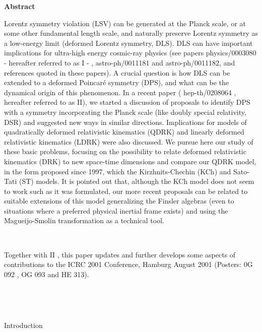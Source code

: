 \documentclass[a4paper,12pt,dvips]{article}
\makeatletter
\renewcommand{\section}{\@startsection{section}{1}{0in}
	{0.4\baselineskip}{0.1\baselineskip}{\Large\bf}}
\makeatother
\begin{document}
\begin{center}
{\large \bf Abstract\\}
\end{center}
\vspace{-0.5ex}
%
%
Lorentz symmetry violation (LSV) 
can be generated at the Planck scale, or at some
other fundamental length scale, and
naturally preserve Lorentz symmetry
as a low-energy limit (deformed Lorentz symmetry, DLS). 
DLS can
have important implications for ultra-high energy cosmic-ray physics
(see papers physics/0003080 - hereafter referred to as I - , astro-ph/0011181 and astro-ph/0011182, and references quoted in these papers). A crucial
question is how DLS can be extended to a deformed Poincar\'e symmetry (DPS), and what can be the dynamical origin of this phenomenon. In a recent paper ( hep-th/0208064 , hereafter referred to as II), we started a discussion of proposals to identify DPS with a symmetry incorporating the Planck scale (like doubly special relativity, DSR) and suggested new ways in similar directions. Implications for models of quadratically deformed relativistic kinematics (QDRK) and linearly deformed relativistic kinematics (LDRK) were also discussed. We pursue here our study of these basic problems, focusing on the possibility to relate deformed relativistic kinematics (DRK) to new space-time dimensions and compare our QDRK model, in the form proposed since 1997, which the Kirzhnits-Chechin (KCh) and Sato-Tati (ST) models. It is pointed out that, although the KCh model does not seem to work such as it was formulated, our more recent proposals can be related to suitable extensions of this model generalizing the Finsler algebras (even to situations where a preferred physical inertial frame exists) and using the Magueijo-Smolin transformation as a technical tool.

~ 

Together with II , this paper updates and further develops some aspects
of contributions to the ICRC 2001 Conference, Hamburg August 2001 (Posters: 0G 092 , OG 093 and HE 313).
~
%
~
\vspace{1ex}

~

%
%
~ 

\section{Introduction}
\label{introduction.sec}
\end{document}
